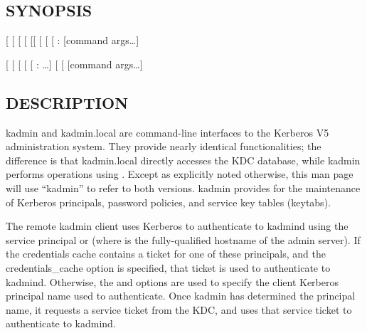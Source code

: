 \documentclass[letterpaper,10pt,english]{sphinxmanual}
\begin{document}
\subsection{SYNOPSIS}
\label{\detokenize{admin/admin_commands/kadmin_local:synopsis}}\label{\detokenize{admin/admin_commands/kadmin_local:kadmin-synopsis}}
{[}\textbar{}\sphinxstylestrong{-N}{]}
{[} \sphinxstyleemphasis{realm}{]}
{[} \sphinxstyleemphasis{principal}{]}
{[} \sphinxstyleemphasis{query}{]}
{[}{[} \sphinxstyleemphasis{cache\_name}{]}\textbar{}{[} {[} \sphinxstyleemphasis{keytab}{]}{]}\textbar{}\sphinxstylestrong{-n}{]}
{[} \sphinxstyleemphasis{password}{]}
{[} \sphinxstyleemphasis{admin\_server}{[}:\sphinxstyleemphasis{port}{]}{]}
{[}command args…{]}

{[} \sphinxstyleemphasis{realm}{]}
{[} \sphinxstyleemphasis{principal}{]}
{[} \sphinxstyleemphasis{query}{]}
{[} \sphinxstyleemphasis{dbname}{]}
{[} : …{]}
{[}\sphinxstylestrong{-m}{]}
{[} \sphinxstyleemphasis{db\_args}{]}
{[}command args…{]}


\subsection{DESCRIPTION}
\label{\detokenize{admin/admin_commands/kadmin_local:kadmin-synopsis-end}}\label{\detokenize{admin/admin_commands/kadmin_local:description}}
kadmin and kadmin.local are command-line interfaces to the Kerberos V5
administration system.  They provide nearly identical functionalities;
the difference is that kadmin.local directly accesses the KDC
database, while kadmin performs operations using {\hyperref[\detokenize{admin/admin_commands/kadmind:kadmind-8}]{}}.
Except as explicitly noted otherwise, this man page will use “kadmin”
to refer to both versions.  kadmin provides for the maintenance of
Kerberos principals, password policies, and service key tables
(keytabs).

The remote kadmin client uses Kerberos to authenticate to kadmind
using the service principal  or 
(where  is the fully-qualified hostname of the admin
server).  If the credentials cache contains a ticket for one of these
principals, and the  credentials\_cache option is specified, that
ticket is used to authenticate to kadmind.  Otherwise, the  and
 options are used to specify the client Kerberos principal name
used to authenticate.  Once kadmin has determined the principal name,
it requests a service ticket from the KDC, and uses that service
ticket to authenticate to kadmind.
\end{document}
